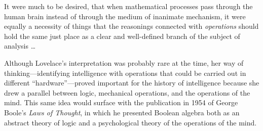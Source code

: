\documentclass[version=last,draft=false,paper=A4,portrait,twoside=true,twocolumn=false,headinclude=false,footinclude=false,mpinclude=true,fontsize=12,BCOR=20mm,DIV=calc,pagesize=auto,open=right,chapterprefix=true,numbers=autoendperiod,headsepline=false,headings=twolinechapter,parskip=false]{scrbook}
\begin{document}
\begin{displayquote}
It were much to be desired, that when mathematical processes pass through
the human brain instead of through the medium of inanimate mechanism, it
were equally a necessity of things that the reasonings connected with
\emph{operations} should hold the same just place as a clear and well-defined
branch of the subject of analysis \ldots
\end{displayquote}

Although Lovelace's interpretation was probably rare at the time, her way
of thinking---identifying intelligence with operations that could be
carried out in different ``hardware''---proved important for the history of
intelligence because she drew a parallel between logic, mechanical
operations, and the operations of the mind. This same idea would surface
with the publication in 1954 of George Boole's \emph{Laws of Thought}, in which he
presented Boolean algebra both as an abstract theory of logic and a
psychological theory of the operations of the mind.
\end{document}
